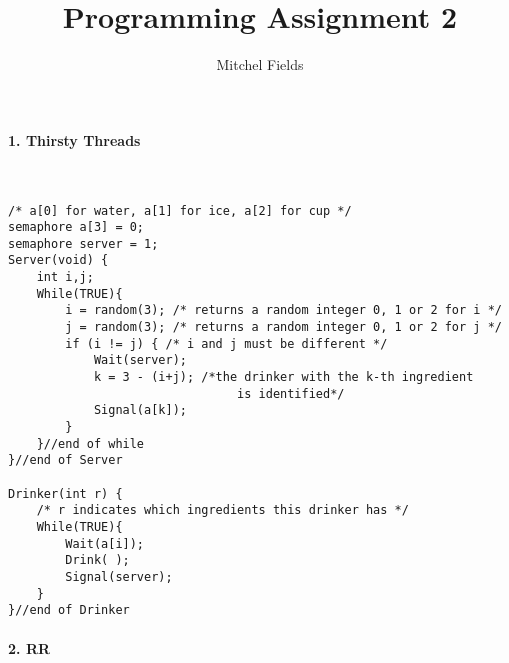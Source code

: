 \documentclass{article}
\begin{document}
\title{Programming Assignment 2}
\author{Mitchel Fields}
\date{}
\maketitle

\paragraph{1. Thirsty Threads}\mbox{}\\

\begin{verbatim}
/* a[0] for water, a[1] for ice, a[2] for cup */
semaphore a[3] = 0;
semaphore server = 1;
Server(void) {
    int i,j;
    While(TRUE){
        i = random(3); /* returns a random integer 0, 1 or 2 for i */
        j = random(3); /* returns a random integer 0, 1 or 2 for j */
        if (i != j) { /* i and j must be different */
            Wait(server);
            k = 3 - (i+j); /*the drinker with the k-th ingredient
                                is identified*/
            Signal(a[k]);
        }
    }//end of while
}//end of Server

Drinker(int r) {
    /* r indicates which ingredients this drinker has */
    While(TRUE){
        Wait(a[i]);
        Drink( );
        Signal(server);
    }
}//end of Drinker
\end{verbatim}

\paragraph{2. RR}\mbox{}\\
\end{document}
